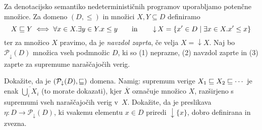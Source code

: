 \documentclass[arhiv]{izpit}
\begin{document}
\nadaljevanje

\naloga[\tocke{20}]
\newcommand{\sub}{\sqsubseteq}
\newcommand{\pow}[1]{\mathcal{P}(#1)}
\newcommand{\powd}[1]{\mathcal{P}_{\downarrow}(#1)}
\newcommand{\down}[1]{\mathop{\downarrow} #1}
Za denotacijsko semantiko nedeterminističnih programov uporabljamo potenčne množice. Za domeno $(D, \leq)$ in množici $X, Y \subseteq D$ definiramo
\[
  X \sub Y \iff \forall x \in X. \exists y \in Y. x \leq y
  \qquad\text{in}\qquad
  \down{X} = \{ x' \in D \mid \exists x \in X. x' \leq x \}
\]
ter za množico $X$ pravimo, da je \emph{navzdol zaprta}, če velja $X = \down{X}$. Naj bo $\powd{D}$ množica vseh podmnožic $D$, ki so (1) neprazne, (2) navzdol zaprte in (3) zaprte za supremume naraščajočih verig.

\podnaloga Dokažite, da je $(\powd{D}, \sub)$ domena. Namig: supremum verige $X_1 \sub X_2 \sub \cdots$ je enak $\overline{\bigcup_i X_i}$ (to morate dokazati), kjer $\overline{X}$ označuje množico $X$, razširjeno s supremumi vseh naraščajočih verig v~$X$.
\podnaloga Dokažite, da je preslikava $\eta : D \to \powd{D}$, ki vsakemu elementu $x \in D$ priredi $\down{\{ x \}}$, dobro definirana in zvezna.

\nadaljevanje
\end{document}
